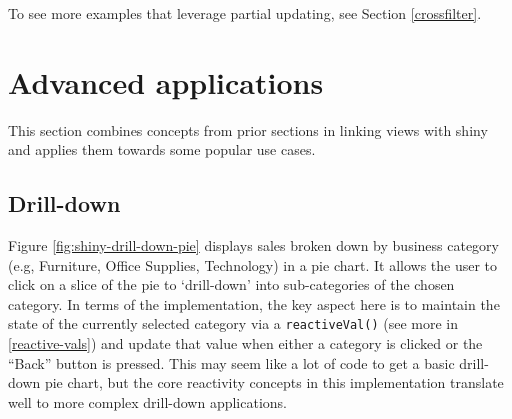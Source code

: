 \documentclass[
  12pt,
]{krantz}
\begin{document}
To see more examples that leverage partial updating, see Section \ref{crossfilter}.

\hypertarget{advanced-applications}{%
\section{Advanced applications}\label{advanced-applications}}

This section combines concepts from prior sections in linking views with shiny and applies them towards some popular use cases.

\hypertarget{drill-down}{%
\subsection{Drill-down}\label{drill-down}}

Figure \ref{fig:shiny-drill-down-pie} displays sales broken down by business category (e.g, Furniture, Office Supplies, Technology) in a pie chart. It allows the user to click on a slice of the pie to `drill-down' into sub-categories of the chosen category. In terms of the implementation, the key aspect here is to maintain the state of the currently selected category via a \texttt{reactiveVal()} (see more in \ref{reactive-vals}) and update that value when either a category is clicked or the ``Back'' button is pressed. This may seem like a lot of code to get a basic drill-down pie chart, but the core reactivity concepts in this implementation translate well to more complex drill-down applications.
\end{document}
